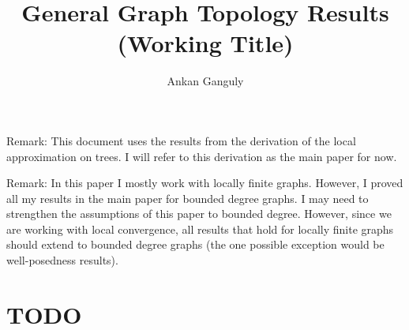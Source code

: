 \documentclass[12pt]{article}
\newcommand{\skipLine}{\vspace{12pt}}
\begin{document}
\title{General Graph Topology Results (Working Title)}
\author{Ankan Ganguly}

\maketitle

Remark: This document uses the results from the derivation of the local approximation on trees. I will refer to this derivation as the main paper for now.

\skipLine

Remark: In this paper I mostly work with locally finite graphs. However, I proved all my results in the main paper for bounded degree graphs. I may need to strengthen the assumptions of this paper to bounded degree. However, since we are working with local convergence, all results that hold for locally finite graphs should extend to bounded degree graphs (the one possible exception would be well-posedness results).

\tableofcontents

\section{TODO}
\end{document}
